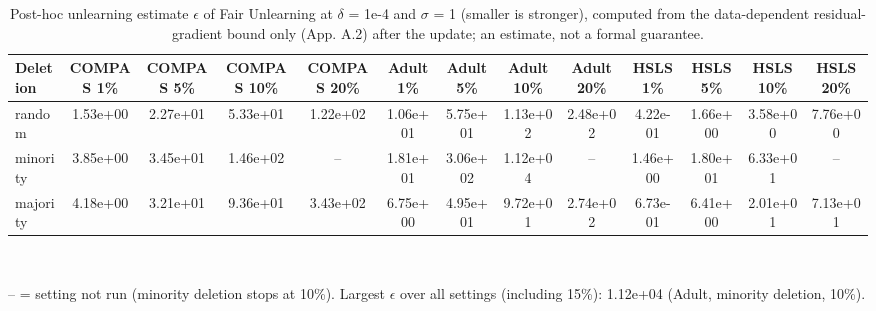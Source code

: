 \begin{table}[t]
\centering
\scriptsize
\caption{Post-hoc unlearning estimate $\epsilon$ of Fair Unlearning at $\delta$ = 1e-4 and $\sigma$ = 1 (smaller is stronger), computed from the data-dependent residual-gradient bound only (App. A.2) after the update; an estimate, not a formal guarantee.}
\label{tab:certificate}
\begin{tabular}{lcccccccccccc}
\hline
Deletion & COMPAS 1\% & COMPAS 5\% & COMPAS 10\% & COMPAS 20\% & Adult 1\% & Adult 5\% & Adult 10\% & Adult 20\% & HSLS 1\% & HSLS 5\% & HSLS 10\% & HSLS 20\% \\
\hline
random & 1.53e+00 & 2.27e+01 & 5.33e+01 & 1.22e+02 & 1.06e+01 & 5.75e+01 & 1.13e+02 & 2.48e+02 & 4.22e-01 & 1.66e+00 & 3.58e+00 & 7.76e+00 \\
minority & 3.85e+00 & 3.45e+01 & 1.46e+02 & -- & 1.81e+01 & 3.06e+02 & 1.12e+04 & -- & 1.46e+00 & 1.80e+01 & 6.33e+01 & -- \\
majority & 4.18e+00 & 3.21e+01 & 9.36e+01 & 3.43e+02 & 6.75e+00 & 4.95e+01 & 9.72e+01 & 2.74e+02 & 6.73e-01 & 6.41e+00 & 2.01e+01 & 7.13e+01 \\
\hline
\end{tabular}
\\[2pt]\parbox{\textwidth}{\footnotesize -- = setting not run (minority deletion stops at 10\%). Largest $\epsilon$ over all settings (including 15\%): 1.12e+04 (Adult, minority deletion, 10\%).}
\end{table}
